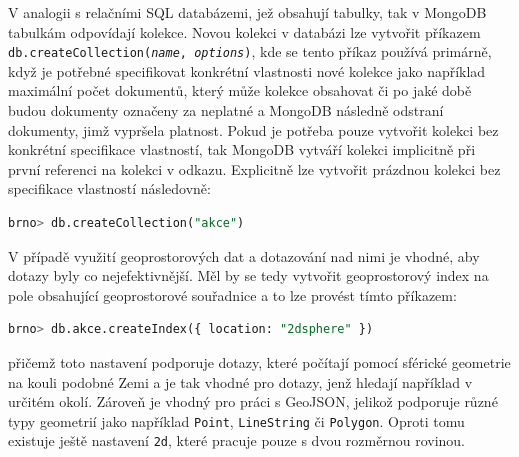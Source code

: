 \documentclass[a4paper, 11pt]{article}
\begin{document}
    V analogii s relačními SQL databázemi, jež obsahují tabulky, tak v MongoDB tabulkám odpovídají kolekce. Novou kolekci v databázi lze vytvořit příkazem \texttt{db.createCollection(\textit{name}, \textit{options})}, kde se tento příkaz používá primárně, když je potřebné specifikovat konkrétní vlastnosti nové kolekce jako například maximální počet dokumentů, který může kolekce obsahovat či po jaké době budou dokumenty označeny za neplatné a MongoDB následně odstraní dokumenty, jimž vypršela platnost. Pokud je potřeba pouze vytvořit kolekci bez konkrétní specifikace vlastností, tak MongoDB vytváří kolekci implicitně při první referenci na kolekci v odkazu. Explicitně lze vytvořit prázdnou kolekci bez specifikace vlastností následovně:
    \begin{lstlisting}[style=NoSQL, language=SQL, framesep=10pt]
        brno> db.createCollection("akce")
    \end{lstlisting}

    V případě využití geoprostorových dat a dotazování nad nimi je vhodné, aby dotazy byly co nejefektivnější. Měl by se tedy vytvořit geoprostorový index na pole obsahující geoprostorové souřadnice a to lze provést tímto příkazem:
    \begin{lstlisting}[style=NoSQL, language=SQL, framesep=10pt]
        brno> db.akce.createIndex({ location: "2dsphere" })
    \end{lstlisting}
    přičemž toto nastavení podporuje dotazy, které počítají pomocí sférické geometrie na kouli podobné Zemi a je tak vhodné pro dotazy, jenž hledají například v určitém okolí. Zároveň je vhodný pro práci s GeoJSON, jelikož podporuje různé typy geometrií jako například \texttt{Point}, \texttt{LineString} či \texttt{Polygon}.
 Oproti tomu existuje ještě nastavení \texttt{2d}, které pracuje pouze s dvou rozměrnou rovinou.
    
\end{document}
